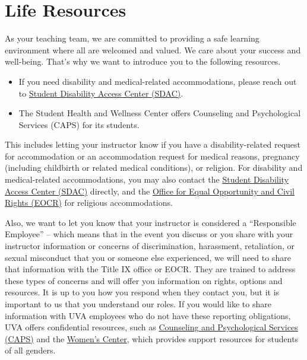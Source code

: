 \documentclass[12pt]{article}
\begin{document}
	
	
	
	\section{Life Resources}
	
        As your teaching team, we are committed to providing a safe learning environment where all are welcomed and valued. We care about your success and well-being. That's why we want to introduce you to the following resources.

        \begin{itemize}
            \item If you need disability and medical-related accommodations, please reach out to \href{https://www.studenthealth.virginia.edu/SDAC}{Student Disability Access Center (SDAC)}.
            \item The Student Health and Wellness Center offers Counseling and Psychological Services (CAPS) for its students. 
        \end{itemize}
        
        This includes letting your instructor know if you have a disability-related request for accommodation or an accommodation request for medical reasons, pregnancy (including childbirth or related medical conditions), or religion.  For disability and medical-related accommodations, you may also contact the \href{https://www.studenthealth.virginia.edu/SDAC}{Student Disability Access Center (SDAC)} directly, and the \href{https://eocr.virginia.edu/student-religious-accommodations}{Office for Equal Opportunity and Civil Rights (EOCR)} for religious accommodations.
        
        Also, we want to let you know that your instructor is considered a “Responsible Employee” – which means that in the event you discuss or you share with your instructor information or concerns of discrimination, harassment, retaliation, or sexual misconduct that you or someone else experienced, we will need to share that information with the Title IX office or EOCR. They are trained to address these types of concerns and will offer you information on rights, options and resources.  It is up to you how you respond when they contact you, but it is important to us that you understand our roles.  If you would like to share information with UVA employees who do not have these reporting obligations, UVA offers confidential resources, such as \href{https://www.studenthealth.virginia.edu/CAPS}{Counseling and Psychological Services (CAPS)} and the \href{https://womenscenter.virginia.edu/}{Women’s Center}, which provides support resources for students of all genders.
        
\end{document}

